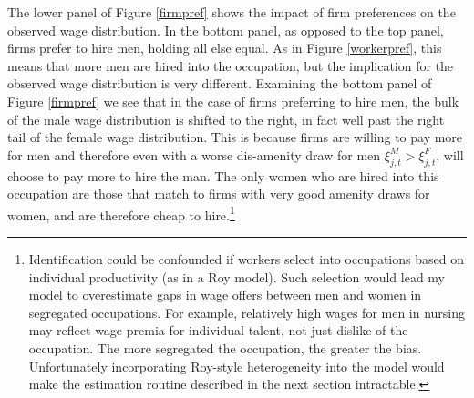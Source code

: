 \documentclass[12pt]{article}
\begin{document}
The lower panel of Figure \ref{firmpref} shows the impact of firm preferences on the observed wage distribution. In the bottom panel, as opposed to the top panel, firms prefer to hire men, holding all else equal. As in Figure \ref{workerpref}, this means that more men are hired into the occupation, but the implication for the observed wage distribution is very different. Examining the bottom panel of Figure \ref{firmpref} we see that in the case of firms preferring to hire men, the bulk of the male wage distribution is shifted to the right, in fact well past the right tail of the female wage distribution. This is because firms are willing to pay more for men and therefore even with a worse dis-amenity draw for men $\xi^M_{j,t} > \xi^F_{j,t}$, will choose to pay more to hire the man. The only women who are hired into this occupation are those that match to firms with very good amenity draws for women, and are therefore cheap to hire.\footnote{Identification could be confounded if workers select into occupations based on individual productivity (as in a Roy model). Such selection would lead my model to overestimate gaps in wage offers between men and women in segregated occupations. For example, relatively high wages for men in nursing may reflect wage premia for individual talent, not just dislike of the occupation. The more segregated the occupation, the greater the bias. Unfortunately incorporating Roy-style heterogeneity into the model would make the estimation routine described in the next section intractable.}

\end{document}
